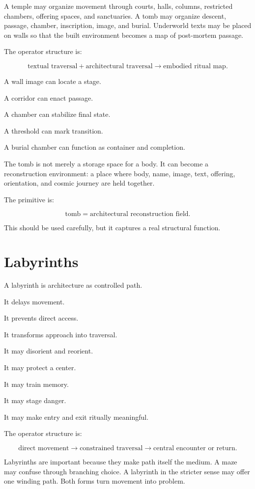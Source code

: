\documentclass[11pt]{book}
\begin{document}
A temple may organize movement through courts, halls, columns, restricted chambers, offering spaces, and sanctuaries. A tomb may organize descent, passage, chamber, inscription, image, and burial. Underworld texts may be placed on walls so that the built environment becomes a map of post-mortem passage.

The operator structure is:

\[
\text{textual traversal}
+
\text{architectural traversal}
\rightarrow
\text{embodied ritual map}.
\]

A wall image can locate a stage.

A corridor can enact passage.

A chamber can stabilize final state.

A threshold can mark transition.

A burial chamber can function as container and completion.

The tomb is not merely a storage space for a body. It can become a reconstruction environment: a place where body, name, image, text, offering, orientation, and cosmic journey are held together.

The primitive is:

\[
\text{tomb} = \text{architectural reconstruction field}.
\]

This should be used carefully, but it captures a real structural function.

\section{Labyrinths}

A labyrinth is architecture as controlled path.

It delays movement.

It prevents direct access.

It transforms approach into traversal.

It may disorient and reorient.

It may protect a center.

It may train memory.

It may stage danger.

It may make entry and exit ritually meaningful.

The operator structure is:

\[
\text{direct movement}
\rightarrow
\text{constrained traversal}
\rightarrow
\text{central encounter or return}.
\]

Labyrinths are important because they make path itself the medium. A maze may confuse through branching choice. A labyrinth in the stricter sense may offer one winding path. Both forms turn movement into problem.
\end{document}

